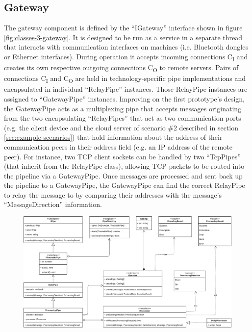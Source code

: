 \subsection{Gateway} The gateway component is defined by the \enquote{IGateway} interface shown in figure \ref{fig:classes-3-gateway}. It is designed to be run as a service in a separate thread that interacts with communication interfaces on machines (i.e. Bluetooth dongles or Ethernet interfaces). During operation it accepts incoming connections C\textsubscript{I} and creates its own respective outgoing connections C\textsubscript{O} to remote servers. Pairs of connections C\textsubscript{I} and C\textsubscript{O} are held in technology-specific pipe implementations and encapsulated in individual \enquote{RelayPipe} instances. Those RelayPipe instances are assigned to \enquote{GatewayPipe} instances. Improving on the first prototype's design, the GatewayPipe acts as a multiplexing pipe that accepts messages originating from the two encapsulating \enquote{RelayPipes} that act as two communication ports (e.g. the client device and the cloud server of scenario \#2 described in section \ref{sec:example-scenarios}) that hold information about the address of their communication peers in their address field (e.g. an \ac{IP} address of the remote peer). For instance, two \ac{TCP} client sockets can be handled by two \enquote{TcpPipes} (that inherit from the RelayPipe class), allowing \ac{TCP} packets to be routed into the pipeline via a GatewayPipe. Once messages are processed and sent back up the pipeline to a GatewayPipe, the GatewayPipe can find the correct RelayPipe to relay the message to by comparing their addresses with the message's \enquote{MessageDirection} information.


\begin{figure}[h]
    \centering
    \includegraphics[width=14cm]{img/ch05/classes-2-pipes.pdf}
    \label{fig:classes-2-pipes}
\end{figure}

